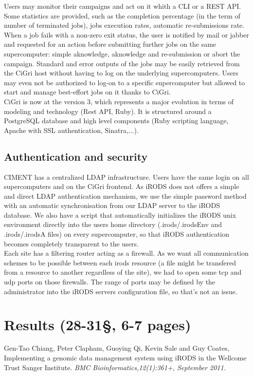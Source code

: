 \documentclass[a4paper, 10pt]{article}
\begin{document}
\begin{multicols}{2}

Users may monitor their campaigns and act on it whith a CLI or a REST API. Some statistics are provided, such as the completion percentage (in the term of number of terminated jobs), jobs execution rates, automatic re-submissions rate. When a job fails with a non-zero exit status, the user is notified by mail or jabber and requested for an action before submitting further jobs on the same supercomputer: simple aknowledge, aknowledge and re-submission or abort the campaign. Standard and error outputs of the jobs may be easily retrieved from the CiGri host without having to log on the underlying supercomputers. Users may even not be authorized to log-on to a specific supercomputer but allowed to start and manage best-effort jobs on it thanks to CiGri.
\\
CiGri is now at the version 3, which represents a major evolution in terms of modeling and technology (Rest API, Ruby). It is structured around a PostgreSQL database and high level components (Ruby scripting language, Apache with SSL authentication, Sinatra,...).

\newpage

\subsection{Authentication and security}

CIMENT has a centralized LDAP infrastructure. Users have the same login on all supercomputers and on the CiGri frontend. As iRODS does not offers a simple and direct LDAP authentication mechanism, we use the simple password method with an automatic synchronisation from our LDAP server to the iRODS database. We also have a script that automatically initializes the iRODS unix environment directly into the users home directory (.irods/.irodsEnv and .irods/.irodsA files) on every supercomputer, so that iRODS authentication becomes completely transparent to the users.
\\
Each site has a filtering router acting as a firewall. As we want all communication schemes to be possible between each irods resource (a file might be transfered from a resource to another regardless of the site), we had to open some tcp and udp ports on those firewalls. The range of ports may be defined by the administrator into the iRODS servers configuration file, so that's not an issue.


\section{Results (28-31\S, 6-7 pages)}



\begin{thebibliography}{9}
 Gen-Tao Chiang, Peter Clapham, Guoying Qi, Kevin Sale and Guy Coates,
 Implementing a genomic data management system using iRODS in the Wellcome Trust Sanger Institute.
{\em BMC Bioinformatics,12(1):361+, September 2011.}
\end{thebibliography}

\end{multicols}
\end{document}
